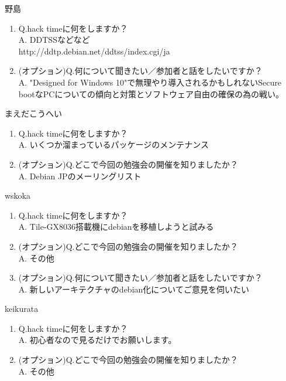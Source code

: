 \begin{prework}{ 野島 }
  \begin{enumerate}
  \item Q.hack timeに何をしますか？\\
    A. DDTSSなどなど\\
    http://ddtp.debian.net/ddtss/index.cgi/ja
  \item (オプション)Q.何について聞きたい／参加者と話をしたいですか？\\
    A. "Designed for Windows 10"で無理やり導入されるかもしれないSecure bootなPCについての傾向と対策とソフトウェア自由の確保の為の戦い。
  \end{enumerate}
\end{prework}

\begin{prework}{ まえだこうへい }
  \begin{enumerate}
  \item Q.hack timeに何をしますか？\\
    A. いくつか溜まっているパッケージのメンテナンス
  \item (オプション)Q.どこで今回の勉強会の開催を知りましたか？\\
    A. Debian JPのメーリングリスト
  \end{enumerate}
\end{prework}

\begin{prework}{ wskoka }
  \begin{enumerate}
  \item Q.hack timeに何をしますか？\\
    A. Tile-GX8036搭載機にdebianを移植しようと試みる
  \item (オプション)Q.どこで今回の勉強会の開催を知りましたか？\\
    A. その他
  \item (オプション)Q.何について聞きたい／参加者と話をしたいですか？\\
    A. 新しいアーキテクチャのdebian化についてご意見を伺いたい
  \end{enumerate}
\end{prework}

\begin{prework}{ keikurata }
  \begin{enumerate}
  \item Q.hack timeに何をしますか？\\
    A. 初心者なので見るだけでお願いします。
  \item (オプション)Q.どこで今回の勉強会の開催を知りましたか？\\
    A. その他
  \end{enumerate}
\end{prework}

